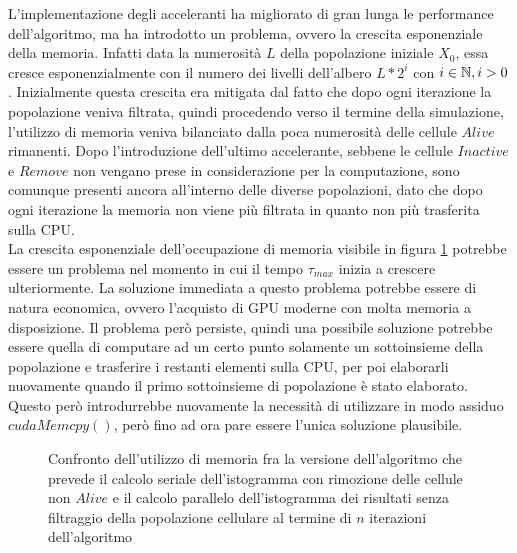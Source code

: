 L'implementazione degli acceleranti ha migliorato di gran lunga le
performance dell'algoritmo, ma ha introdotto un problema, ovvero la crescita
esponenziale della memoria.
Infatti data la numerosità $L$ della popolazione iniziale $X_{0}$, essa cresce
esponenzialmente con il numero dei livelli dell'albero $L * 2^i$ con
$i \in \mathbb{N}, i > 0$. Inizialmente questa crescita era mitigata dal fatto che
dopo ogni iterazione la popolazione veniva filtrata, quindi procedendo verso
il termine della simulazione, l'utilizzo di memoria veniva bilanciato dalla
poca numerosità delle cellule $Alive$ rimanenti.
Dopo l'introduzione dell'ultimo accelerante, sebbene le cellule $Inactive$ e
$Remove$ non vengano prese in considerazione per la computazione, sono
comunque presenti ancora all'interno delle diverse popolazioni, dato che
dopo ogni iterazione la memoria non viene più filtrata in quanto non più
trasferita sulla CPU.
\\
La crescita esponenziale dell'occupazione di memoria visibile in figura
\ref{chart:serial-parallel-histogram} potrebbe essere un
problema nel momento in cui il tempo $\tau_{max}$ inizia a crescere
ulteriormente. La soluzione immediata a questo problema potrebbe essere di
natura economica, ovvero l'acquisto di GPU moderne con molta memoria a
disposizione. Il problema però persiste, quindi una possibile soluzione
potrebbe essere quella di computare ad un certo punto solamente un sottoinsieme
della popolazione e trasferire i restanti elementi sulla CPU, per poi
elaborarli nuovamente quando il primo sottoinsieme di popolazione è stato
elaborato. Questo però introdurrebbe nuovamente la necessità di utilizzare
in modo assiduo $cudaMemcpy()$, però fino ad ora pare essere l'unica soluzione
plausibile.

\begin{figure}[t]
    \centering
    \caption{Confronto dell'utilizzo di memoria fra la versione dell'algoritmo
        che prevede il calcolo seriale dell'istogramma con rimozione delle
        cellule non $Alive$ e il calcolo parallelo dell'istogramma dei risultati
        senza filtraggio della popolazione cellulare al termine di $n$ iterazioni
        dell'algoritmo}
    \label{chart:serial-parallel-histogram} 
\end{figure}
